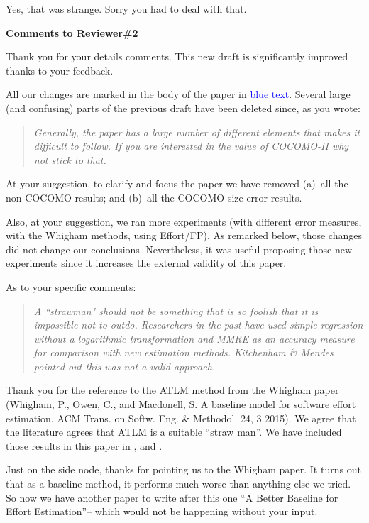 \noindent Yes, that was strange. Sorry you had to deal with that.

\noindent
{\bf Comments to Reviewer\#2}

\noindent
Thank you for your details comments.  This new draft
is significantly improved thanks to your  feedback. 

All our changes are marked in the body of the paper in \textcolor{blue}{blue text}.
Several large (and confusing) parts of the previous draft have been deleted since,
as you wrote:

\begin{quote}{\em  Generally, the paper has a large number of different elements  that makes it difficult to follow. If you are interested in the value of COCOMO-II why not stick to that.
}\end{quote}

At your suggestion, to clarify and focus the paper we have removed (a)~all the non-COCOMO results;
and (b)~all the COCOMO size error results.

Also, at your suggestion, we ran more experiments (with different error measures,
with the Whigham methods, using Effort/FP). As remarked below, those
changes did not change our conclusions. Nevertheless, it was useful proposing
those new experiments since it increases the external validity of this paper.

As to your specific comments:

\begin{quote}{\em A ``strawman" should not be something that is so
  foolish that it is impossible not to
  outdo. Researchers in the past have used simple
  regression without a logarithmic transformation
  and MMRE as an accuracy measure for comparison
  with new estimation methods.  Kitchenham \& Mendes
  pointed out this was not a valid approach.}\end{quote}

Thank you for the reference to the ATLM method from
the Whigham paper (Whigham, P., Owen, C., and
Macdonell, S. A baseline model for software effort
estimation. ACM Trans. on Softw. Eng. \&
Methodol. 24, 3 2015). We agree that the literature
agrees that ATLM is a suitable ``straw man''. We
have included those results in this paper in
,  and .

Just on the side node, thanks for pointing us to
the  Whigham paper. It turns out that  as a baseline method,
it performs much worse than anything else we tried. So now we have another paper
to write after this one ``A Better Baseline for Effort Estimation''-- which would
not be happening without your input.

